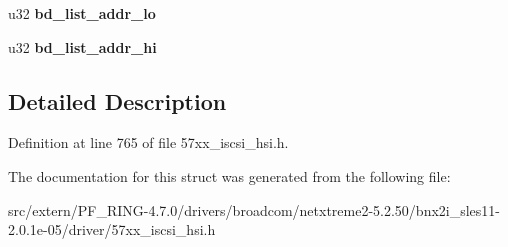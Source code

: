 \begin{DoxyCompactItemize}
\item 
\hypertarget{structbnx2i__login__request_a25b88c4e580f013fa05f7e72d5386013}{
u32 {\bfseries bd\_\-list\_\-addr\_\-lo}}
\label{structbnx2i__login__request_a25b88c4e580f013fa05f7e72d5386013}

\item 
\hypertarget{structbnx2i__login__request_aa08264fb88563146e710aad721527a68}{
u32 {\bfseries bd\_\-list\_\-addr\_\-hi}}
\label{structbnx2i__login__request_aa08264fb88563146e710aad721527a68}

\end{DoxyCompactItemize}


\subsection{Detailed Description}


Definition at line 765 of file 57xx\_\-iscsi\_\-hsi.h.



The documentation for this struct was generated from the following file:\begin{DoxyCompactItemize}
\item 
src/extern/PF\_\-RING-\/4.7.0/drivers/broadcom/netxtreme2-\/5.2.50/bnx2i\_\-sles11-\/2.0.1e-\/05/driver/57xx\_\-iscsi\_\-hsi.h\end{DoxyCompactItemize}
